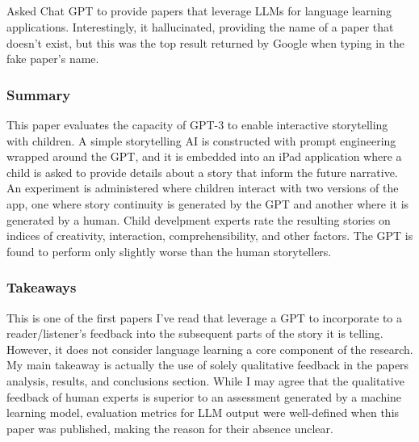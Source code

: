 \documentclass[
	letterpaper, %
]{jdf}
\begin{document}
\subsection{}

Asked Chat GPT to provide papers that leverage LLMs for language learning applications. Interestingly, it hallucinated, providing the name of a paper that doesn't exist, but this was the top result returned by Google when typing in the fake paper's name.

\subsubsection{Summary}
This paper evaluates the capacity of GPT-3 to enable interactive storytelling with children. A simple storytelling AI is constructed with prompt engineering wrapped around the GPT, and it is embedded into an iPad application where a child is asked to provide details about a story that inform the future narrative. An experiment is administered where children interact with two versions of the app, one where story continuity is generated by the GPT and another where it is generated by a human. Child develpment experts rate the resulting stories on indices of creativity, interaction, comprehensibility, and other factors. The GPT is found to perform only slightly worse than the human storytellers.

\subsubsection{Takeaways}
This is one of the first papers I've read that leverage a GPT to incorporate to a reader/listener's feedback into the subsequent parts of the story it is telling. However, it does not consider language learning a core component of the research. My main takeaway is actually the use of solely qualitative feedback in the papers analysis, results, and conclusions section. While I may agree that the qualitative feedback of human experts is superior to an assessment generated by a machine learning model, evaluation metrics for LLM output were well-defined when this paper was published, making the reason for their absence unclear.
\end{document}
